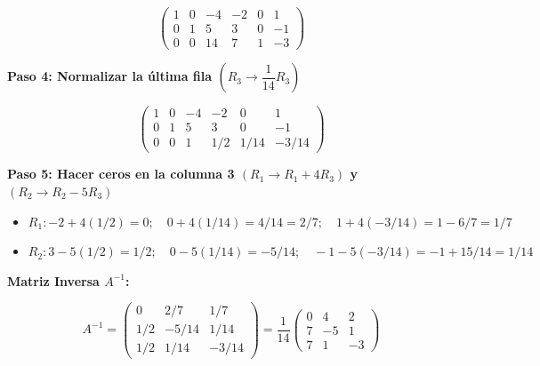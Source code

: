 \documentclass{article}
\begin{document}
	\bigskip
	
	\[
	\left(
	\begin{array}{ccc|ccc}
		1 & 0 &  -4 & -2 & 0 &  1 \\
		0 & 1 &   5 &  3 & 0 & -1 \\
		0 & 0 &  14 &  7 & 1 & -3
	\end{array}
	\right)
	\]
	
	\newpage
	
	
	\noindent \textbf{Paso 4: Normalizar la última fila
		$\left(R_3 \rightarrow \dfrac{1}{14}R_3\right)$}
	
	\bigskip
	
	\[
	\left(
	\begin{array}{ccc|ccc}
		1 & 0 & -4 & -2    & 0      &  1      \\
		0 & 1 &  5 &  3    & 0      & -1      \\
		0 & 0 &  1 &  1/2  & 1/14   & -3/14
	\end{array}
	\right)
	\]
	
	\bigskip
	
	\noindent \textbf{Paso 5: Hacer ceros en la columna 3
		$(R_1 \rightarrow R_1 + 4R_3)$ y $(R_2 \rightarrow R_2 - 5R_3)$}
	
	\begin{itemize}
		\item $R_1 : -2 + 4(1/2) = 0;\quad 0 + 4(1/14) = 4/14 = 2/7;\quad
		1 + 4(-3/14) = 1 - 6/7 = 1/7$
		
		\item $R_2 : 3 - 5(1/2) = 1/2;\quad 0 - 5(1/14) = -5/14;\quad
		-1 - 5(-3/14) = -1 + 15/14 = 1/14$
	\end{itemize}
	
	\newpage
	
	
	\noindent \textbf{Matriz Inversa $A^{-1}$:}
	
	\bigskip
	
	\[
	A^{-1} =
	\begin{pmatrix}
		0   &  2/7   &  1/7   \\
		1/2 & -5/14  &  1/14  \\
		1/2 &  1/14  & -3/14
	\end{pmatrix}
	= \dfrac{1}{14}
	\begin{pmatrix}
		0 &  4 &  2 \\
		7 & -5 &  1 \\
		7 &  1 & -3
	\end{pmatrix}
	\]
	
\end{document}
